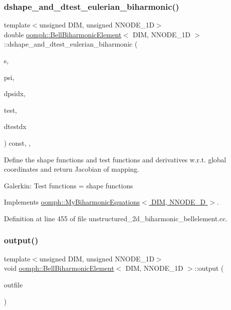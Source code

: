 \subsubsection{\texorpdfstring{dshape\+\_\+and\+\_\+dtest\+\_\+eulerian\+\_\+biharmonic()}{dshape\_and\_dtest\_eulerian\_biharmonic()}}
{\footnotesize\ttfamily template$<$unsigned D\+IM, unsigned N\+N\+O\+D\+E\+\_\+1D$>$ \\
double \hyperlink{classoomph_1_1BellBiharmonicElement}{oomph\+::\+Bell\+Biharmonic\+Element}$<$ D\+IM, N\+N\+O\+D\+E\+\_\+1D $>$\+::dshape\+\_\+and\+\_\+dtest\+\_\+eulerian\+\_\+biharmonic (\begin{DoxyParamCaption}\item[{const Vector$<$ double $>$ \&}]{s,  }\item[{Shape \&}]{psi,  }\item[{D\+Shape \&}]{dpsidx,  }\item[{Shape \&}]{test,  }\item[{D\+Shape \&}]{dtestdx }\end{DoxyParamCaption}) const\hspace{0.3cm}{\ttfamily [inline]}, {\ttfamily [protected]}, {\ttfamily [virtual]}}

Define the shape functions and test functions and derivatives w.\+r.\+t. global coordinates and return Jacobian of mapping.

Galerkin\+: Test functions = shape functions 

Implements \hyperlink{classoomph_1_1MyBiharmonicEquations_a084eaadd62185dad622c7708862f023a}{oomph\+::\+My\+Biharmonic\+Equations$<$ D\+I\+M, N\+N\+O\+D\+E\+\_\+D $>$}.



Definition at line 455 of file unstructured\+\_\+2d\+\_\+biharmonic\+\_\+bellelement.\+cc.

\mbox{\label{classoomph_1_1BellBiharmonicElement_a857d5d7ebdd9eef2b14ef3548fe60e8f}} 
\subsubsection{\texorpdfstring{output()}{output()}\hspace{0.1cm}{\footnotesize\ttfamily [1/4]}}
{\footnotesize\ttfamily template$<$unsigned D\+IM, unsigned N\+N\+O\+D\+E\+\_\+1D$>$ \\
void \hyperlink{classoomph_1_1BellBiharmonicElement}{oomph\+::\+Bell\+Biharmonic\+Element}$<$ D\+IM, N\+N\+O\+D\+E\+\_\+1D $>$\+::output (\begin{DoxyParamCaption}\item[{std\+::ostream \&}]{outfile }\end{DoxyParamCaption})\hspace{0.3cm}{\ttfamily [inline]}}



